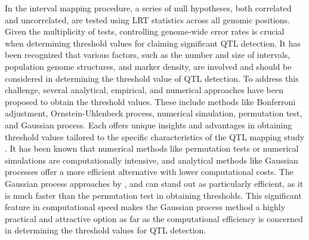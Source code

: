 In the interval mapping procedure, a series of null hypotheses, both correlated and uncorrelated, are tested using LRT statistics across all genomic positions. Given the multiplicity of tests, controlling genome-wide error rates is crucial when determining threshold values for claiming significant QTL detection. It has been recognized that various factors, such as the number and size of intervals, population genome structures, and marker density, are involved and should be considered in determining the threshold value of QTL detection. To address this challenge, several analytical, empirical, and numerical approaches have been proposed to obtain the threshold values. These include methods like Bonferroni adjustment, Ornstein-Uhlenbeck process, numerical simulation, permutation test, and Gaussian process. Each offers unique insights and advantages in obtaining threshold values tailored to the specific characteristics of the QTL mapping study \citep{Lander-1989, Churchill-1994, Rebai-1994, Piepho-2001, Zou-2004, Chang-2009, Guo-2011, Kao-2012}. It has been known that numerical methods like permutation tests or numerical simulations are computationally intensive, and analytical methods like Gaussian processes offer a more efficient alternative with lower computational costs. The Gaussian process approaches by \citet{Chang-2009}, \citet{Guo-2011} and \citet{Kao-2012} can stand out as particularly efficient, as it is much faster than the permutation test in obtaining thresholds. This significant feature in computational speed makes the Gaussian process method a highly practical and attractive option as far as the computational efficiency is concerned in determining the threshold values for QTL detection.

